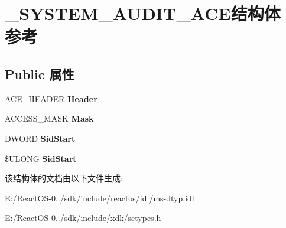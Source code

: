 \hypertarget{struct___s_y_s_t_e_m___a_u_d_i_t___a_c_e}{}\section{\+\_\+\+S\+Y\+S\+T\+E\+M\+\_\+\+A\+U\+D\+I\+T\+\_\+\+A\+C\+E结构体 参考}
\label{struct___s_y_s_t_e_m___a_u_d_i_t___a_c_e}
\subsection*{Public 属性}
\begin{DoxyCompactItemize}
\item 
\mbox{\label{struct___s_y_s_t_e_m___a_u_d_i_t___a_c_e_a636e6b12bb839efc72a2ac6501a76524}} 
\hyperlink{struct___a_c_e___h_e_a_d_e_r}{A\+C\+E\+\_\+\+H\+E\+A\+D\+ER} {\bfseries Header}
\item 
\mbox{\label{struct___s_y_s_t_e_m___a_u_d_i_t___a_c_e_ae77f014416befec4e706723ec8d87ef9}} 
A\+C\+C\+E\+S\+S\+\_\+\+M\+A\+SK {\bfseries Mask}
\item 
\mbox{\label{struct___s_y_s_t_e_m___a_u_d_i_t___a_c_e_a0b897156a3fb6498f84b072124cfe499}} 
D\+W\+O\+RD {\bfseries Sid\+Start}
\item 
\mbox{\label{struct___s_y_s_t_e_m___a_u_d_i_t___a_c_e_ac9fcdbd7116bd1f7aafa170042545a32}} 
\$U\+L\+O\+NG {\bfseries Sid\+Start}
\end{DoxyCompactItemize}


该结构体的文档由以下文件生成\+:\begin{DoxyCompactItemize}
\item 
E\+:/\+React\+O\+S-\/0../sdk/include/reactos/idl/ms-\/dtyp.\+idl\item 
E\+:/\+React\+O\+S-\/0../sdk/include/xdk/setypes.\+h\end{DoxyCompactItemize}
